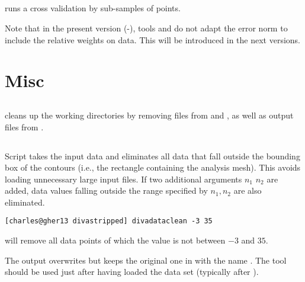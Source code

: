 \subsection{}

 runs a cross validation by sub-samples of points.


Note that in the present version (\diva-\divaversion), tools   and   
do not adapt the error norm to include the relative weights on data. This will be introduced in the next versions.

\section{Misc}

\subsection{}

 cleans up the working directories by removing  files from  and , as well as output files from .

\subsection{}

Script  takes the input data  and eliminates all data that fall outside the bounding box of the contours (i.e., the rectangle containing the analysis mesh). This avoids loading unnecessary large input files. If two additional arguments $n_{1}$ $n_{2}$ are added, data values falling outside the range specified by $n_{1},n_{2}$ are also eliminated.

\example
\begin{lstlisting}[style=Bash]
[charles@gher13 divastripped] divadataclean -3 35
\end{lstlisting}
will remove all data points of which the value is not between $-3$ and $35$.

The output overwrites  but keeps the original one in  with the name . The tool should be used just after having loaded the data set (typically after ).

